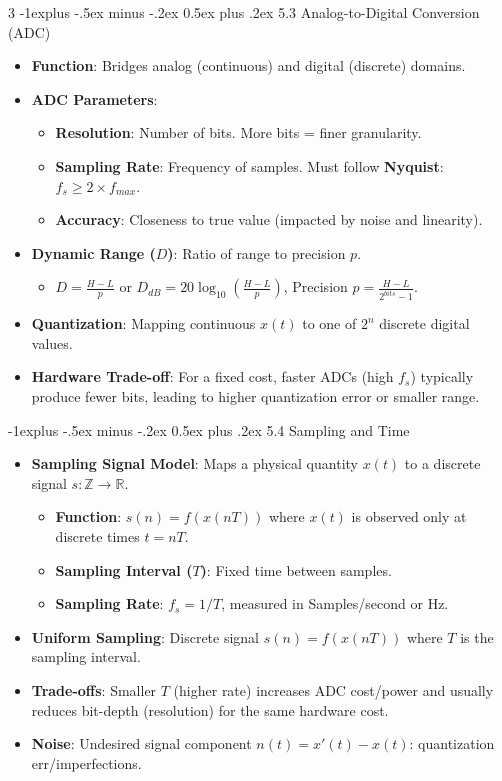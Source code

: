 \documentclass[a4paper, 9pt, landscape]{extarticle}
\makeatletter
\renewcommand{\subsection}{\@startsection{subsection}{2}{0mm}%
                                {-1explus -.5ex minus -.2ex}%
                                {0.5ex plus .2ex}%
                                {\normalfont\normalsize\bfseries}}
\makeatother
\begin{document}
\begin{multicols*}{3}
\subsection{5.3 Analog-to-Digital Conversion (ADC)}
\begin{itemize}
  \item \textbf{Function}: Bridges analog (continuous) and digital (discrete) domains.
  \item \textbf{ADC Parameters}:
    \begin{itemize}
      \item \textbf{Resolution}: Number of bits. More bits = finer granularity.
      \item \textbf{Sampling Rate}: Frequency of samples. Must follow \textbf{Nyquist}: $f_s \ge 2 \times f_{max}$.
      \item \textbf{Accuracy}: Closeness to true value (impacted by noise and linearity).
    \end{itemize}
  \item \textbf{Dynamic Range ($D$)}: Ratio of range to precision $p$.
    \begin{itemize}
      \item $D = \frac{H - L}{p}$ or $D_{dB} = 20\log_{10}(\frac{H-L}{p})$, Precision $p = \frac{H-L}{2^{bits} - 1}$.
    \end{itemize}
  \item \textbf{Quantization}: Mapping continuous $x(t)$ to one of $2^n$ discrete digital values.
  \item \textbf{Hardware Trade-off}: For a fixed cost, faster ADCs (high $f_s$) typically produce fewer bits, leading to higher quantization error or smaller range.
\end{itemize}

\subsection{5.4 Sampling and Time}
\begin{itemize}
  \item \textbf{Sampling Signal Model}: Maps a physical quantity $x(t)$ to a discrete signal $s: \mathbb{Z} \to \mathbb{R}$.
  \begin{itemize}
    \item \textbf{Function}: $s(n) = f(x(nT))$ where $x(t)$ is observed only at discrete times $t = nT$.
    \item \textbf{Sampling Interval ($T$)}: Fixed time between samples.
    \item \textbf{Sampling Rate}: $f_s = 1/T$, measured in Samples/second or Hz.
  \end{itemize}
  \item \textbf{Uniform Sampling}: Discrete signal $s(n) = f(x(nT))$ where $T$ is the sampling interval.
  \item \textbf{Trade-offs}: Smaller $T$ (higher rate) increases ADC cost/power and usually reduces bit-depth (resolution) for the same hardware cost.
  \item \textbf{Noise}: Undesired signal component $n(t) = x'(t) - x(t)$: quantization err/imperfections.
\end{itemize}


\end{multicols*}
\end{document}
